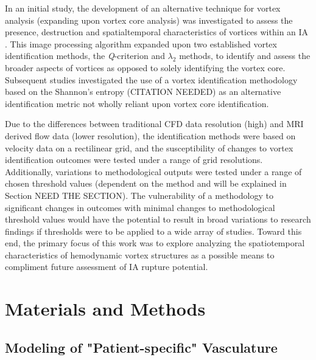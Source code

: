 In an initial study, the development of an alternative technique for vortex analysis (expanding upon vortex core analysis) was investigated to assess the presence, destruction and spatialtemporal characteristics of vortices within an IA \cite{sunderland2016vortex}. This image processing algorithm expanded upon two established vortex identification methods, the \textit{Q}-criterion \cite{hunt1988eddies} and $\lambda_2$ \cite{jeong1995identification} methods, to identify and assess the broader aspects of vortices as opposed to solely identifying the vortex core. Subsequent studies investigated the use of a vortex identification methodology based on the Shannon's entropy (CITATION NEEDED) as an alternative identification metric not wholly reliant upon vortex core identification. 

Due to the differences between traditional CFD data resolution (high) and MRI derived flow data (lower resolution), the identification methods were based on velocity data on a rectilinear grid, and the susceptibility of changes to vortex identification outcomes were tested under a range of grid resolutions. Additionally, variations to methodological outputs were tested under a range of chosen threshold values (dependent on the method and will be explained in Section NEED THE SECTION). The vulnerability of a methodology to significant changes in outcomes with minimal changes to methodological threshold values would have the potential to result in broad variations to research findings if thresholds were to be applied to a wide array of studies. Toward this end, the primary focus of this work was to explore analyzing the spatiotemporal characteristics of hemodynamic vortex structures as a possible means to compliment future assessment of IA rupture potential.  

\section{Materials and Methods}\label{CHAPTER2_SECTION1}
\subsection{Modeling of "Patient-specific" Vasculature}\label{CHAPTER2_SECTION1_SUBSECTION1}

